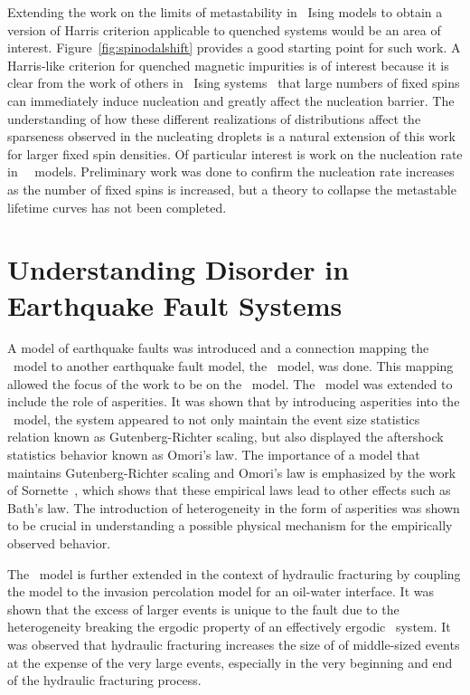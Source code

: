 Extending the work on the limits of metastability in \het\ Ising models to obtain a version of Harris criterion applicable to quenched systems would be an area of interest. Figure~\ref{fig:spinodalshift}  provides a good starting point for such work. A Harris-like criterion for quenched magnetic impurities is of interest because it is clear from the work of others in \het\ Ising systems~\cite{poole13} that large numbers of  fixed spins can immediately induce nucleation and greatly affect the nucleation barrier. The  understanding of how these different realizations of distributions affect the  sparseness observed in the nucleating droplets is a natural extension of this work for larger fixed spin densities. Of particular interest is work on the nucleation rate in \het\ \lr\ models. Preliminary work was done to confirm the nucleation rate increases as the number of fixed spins is increased, but a theory to collapse the metastable lifetime curves has not been completed.


\section{Understanding Disorder in Earthquake Fault Systems}

A model of earthquake faults was introduced and a connection mapping the \ofc\ model to another earthquake fault model, the \rjb\ model, was done. This mapping allowed the focus of the work to be on the \ofc\ model. The \ofc\ model was  extended to include the role of asperities. It was shown that by introducing  asperities into the \ofc\ model, the system appeared to not only maintain the event size statistics relation known as Gutenberg-Richter scaling, but also displayed the aftershock statistics behavior known as Omori's law. The importance of  a model that maintains Gutenberg-Richter scaling and Omori's law is emphasized by the work of Sornette~\cite{sornette03}, which shows that these empirical laws lead to other effects such as Bath's law. The introduction of heterogeneity in the form of asperities was shown to be crucial in understanding a possible physical mechanism for the empirically observed behavior.

The \ofc\ model is further extended in the context of hydraulic fracturing by coupling the model to the invasion percolation model for an oil-water interface. It was shown that the excess of larger events is unique to the fault due to the heterogeneity breaking the ergodic property of an effectively ergodic \ofc\ system. It was  observed that  hydraulic fracturing increases the size of of middle-sized events at the expense of the very large events, especially in the very beginning and end of the hydraulic fracturing process. 

